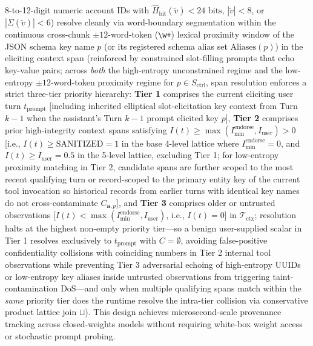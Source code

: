 \documentclass[conference,10pt]{IEEEtran}
\begin{document}
8-to-12-digit numeric account IDs with $\hat{H}_{\text{bit}}(\tilde{v}) < 24\text{ bits}$, $|\tilde{v}| < 8$, or $|\Sigma(\tilde{v})| < 6$) resolve cleanly via word-boundary segmentation within the continuous cross-chunk $\pm 12$-word-token (\texttt{\textbackslash w+}) lexical proximity window of the JSON schema key name $p$ (or its registered schema alias set $\text{Aliases}(p)$) in the eliciting context span (reinforced by constrained slot-filling prompts that echo key-value pairs; across \textit{both} the high-entropy unconstrained regime and the low-entropy $\pm 12$-word-token proximity regime for $p \in S_{\text{ctrl}}$, span resolution enforces a strict three-tier priority hierarchy: \textbf{Tier 1} comprises the current eliciting user turn $t_{\text{prompt}}$ [including inherited elliptical slot-elicitation key context from Turn $k-1$ when the assistant's Turn $k-1$ prompt elicited key $p$], \textbf{Tier 2} comprises prior high-integrity context spans satisfying $I(t) \ge \max(I_{\text{min}}^{\text{endorse}}, I_{\text{user}}) > 0$ [i.e., $I(t) \ge \text{SANITIZED} = 1$ in the base 4-level lattice where $I_{\text{min}}^{\text{endorse}} = 0$, and $I(t) \ge I_{\text{user}} = 0.5$ in the 5-level lattice, excluding Tier 1; for low-entropy proximity matching in Tier 2, candidate spans are further scoped to the most recent qualifying turn or record-scoped to the primary entity key of the current tool invocation so historical records from earlier turns with identical key names do not cross-contaminate $C_{\mathbf{a}, p}$], and \textbf{Tier 3} comprises older or untrusted observations [$I(t) < \max(I_{\text{min}}^{\text{endorse}}, I_{\text{user}})$, i.e., $I(t) = 0$] in $\mathcal{T}_{\text{ctx}}$; resolution halts at the highest non-empty priority tier---so a benign user-supplied scalar in Tier 1 resolves exclusively to $t_{\text{prompt}}$ with $C = \emptyset$, avoiding false-positive confidentiality collisions with coinciding numbers in Tier 2 internal tool observations while preventing Tier 3 adversarial echoing of high-entropy UUIDs or low-entropy key aliases inside untrusted observations from triggering taint-contamination DoS---and only when multiple qualifying spans match within the \textit{same} priority tier does the runtime resolve the intra-tier collision via conservative product lattice join $\sqcup$). This design achieves microsecond-scale provenance tracking across closed-weights models without requiring white-box weight access or stochastic prompt probing.
\end{document}
